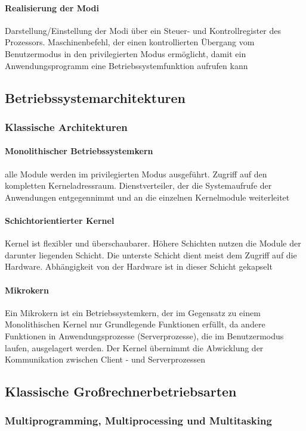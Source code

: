 \documentclass[11pt,a4paper,landscape]{article}
\begin{document}
\begin{multicols*}{3}
	\paragraph{Realisierung der Modi} Darstellung/Einstellung der Modi über ein Steuer- und Kontrollregister des Prozessors. Maschinenbefehl, der einen kontrollierten Übergang vom Benutzermodus in den privilegierten Modus ermöglicht, damit ein Anwendungsprogramm eine Betriebssystemfunktion aufrufen kann
	\subsection{Betriebssystemarchitekturen}
	\subsubsection{Klassische Architekturen}
	\paragraph{Monolithischer Betriebssystemkern} alle Module werden im privilegierten Modus ausgeführt. Zugriff auf den kompletten Kerneladressraum. Dienstverteiler, der die Systemaufrufe der Anwendungen entgegennimmt und an die einzelnen Kernelmodule weiterleitet
	\paragraph{Schichtorientierter Kernel} Kernel ist flexibler und überschaubarer. Höhere Schichten nutzen die Module der darunter liegenden Schicht. Die unterste Schicht dient meist dem Zugriff auf die Hardware. Abhängigkeit von der Hardware ist in dieser Schicht gekapselt
	\paragraph{Mikrokern} Ein Mikrokern ist ein Betriebssystemkern, der im Gegensatz zu einem Monolithischen Kernel nur Grundlegende Funktionen erfüllt, da andere Funktionen in Anwendungsprozesse (Serverprozesse), die im Benutzermodus laufen, ausgelagert werden. Der Kernel übernimmt die Abwicklung der Kommunikation zwischen Client - und Serverprozessen
	\subsection{Klassische Großrechnerbetriebsarten}
	\subsubsection{Multiprogramming, Multiprocessing und Multitasking}

\end{multicols*}
\end{document}
